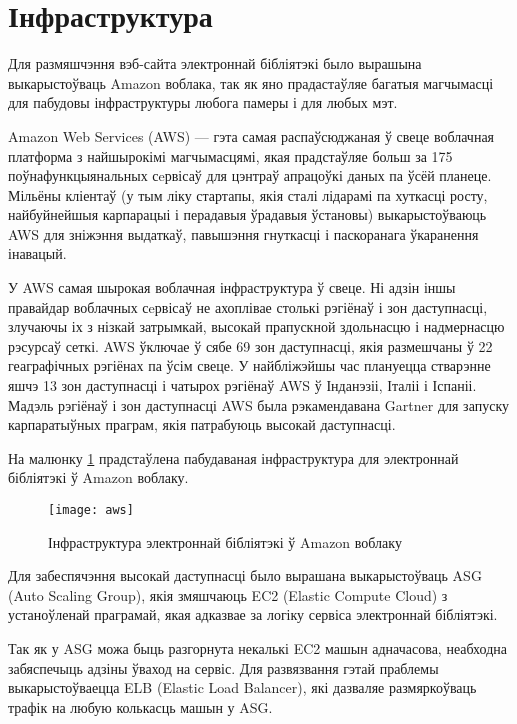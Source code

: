 \section{Інфраструктура}

Для размяшчэння вэб-сайта электроннай бібліятэкі было вырашына выкарыстоўваць Amazon воблака, так як
яно прадастаўляе багатыя магчымасці для пабудовы інфраструктуры любога памеры і для любых мэт.

Amazon Web Services (AWS) --- гэта самая распаўсюджаная ў свеце воблачная платформа з найшырокімі магчымасцямі, якая прадстаўляе больш за 175 поўнафункцыянальных сeрвісаў для цэнтраў апрацоўкі даных па ўсёй планеце. Мільёны кліентаў (у тым ліку стартапы, якія сталі лідарамі па хуткасці росту, найбуйнейшыя карпарацыі і перадавыя ўрадавыя ўстановы) выкарыстоўваюць AWS для зніжэння выдаткаў, павышэння гнуткасці і паскоранага ўкаранення інавацый.

У AWS самая шырокая воблачная інфраструктура ў свеце. Ні адзін іншы правайдар воблачных сeрвісаў не ахоплівае столькі рэгіёнаў і зон даступнасці, злучаючы іх з нізкай затрымкай, высокай прапускной здольнасцю і надмернасцю рэсурсаў сеткі. AWS ўключае ў сябе 69 зон даступнасці, якія размешчаны ў 22 геаграфічных рэгіёнах па ўсім свеце. У найбліжэйшы час плануецца стварэнне яшчэ 13 зон даступнасці і чатырох рэгіёнаў AWS ў Інданэзіі, Італіі і Іспаніі. Мадэль рэгіёнаў і зон даступнасці AWS была рэкамендавана Gartner для запуску карпаратыўных праграм, якія патрабуюць высокай даступнасці.

На малюнку \ref{img: aws infra} прадстаўлена пабудаваная інфраструктура
для электроннай бібліятэкі ў Amazon воблаку.

\begin{figure}[h!]
    \centering
    \texttt{[image: aws]}
    \caption{Інфраструктура электроннай бібліятэкі ў Amazon воблаку}
    \label{img: aws infra} 
\end{figure}

Для забеспячэння высокай даступнасці было вырашана выкарыстоўваць ASG (Auto Scaling Group),
якія змяшчаюць EC2 (Elastic Compute Cloud) з устаноўленай праграмай, якая адказвае за логіку
сервіса электроннай бібліятэкі.

Так як у ASG можа быць разгорнута некалькі EC2 машын адначасова, неабходна забяспечыць адзіны
ўваход на сервіс. Для развязвання гэтай праблемы выкарыстоўваецца ELB (Elastic Load Balancer),
які дазваляе размяркоўваць трафік на любую колькасць машын у ASG.


